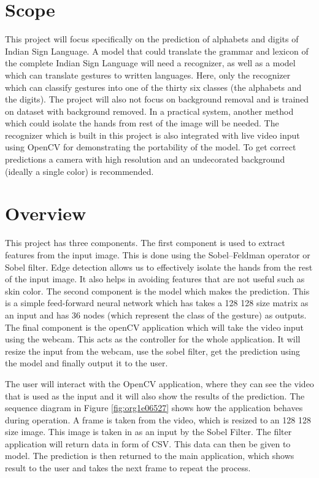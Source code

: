 \documentclass[a4paper,oneside,12pt]{report}
\begin{document}
\section{Scope}
\label{sec:orgebfc65b}
This project will focus specifically on the prediction of alphabets and digits of Indian Sign Language. A model that could translate the grammar and lexicon of the complete Indian Sign Language will need a recognizer, as well as a model which can translate gestures to written languages. Here, only the recognizer which can classify gestures into one of the thirty six classes (the alphabets and the digits). The project will also not focus on background removal and is trained on dataset with background removed. In a practical system, another method which could isolate the hands from rest of the image will be needed. The recognizer which is built in this project is also integrated with live video input using OpenCV for demonstrating the portability of the model. To get correct predictions a camera with high resolution and an undecorated background (ideally a single color) is recommended.

\section{Overview}
\label{sec:orgcb8e8a2}
This project has three components. The first component is used to extract features from the input image. This is done using the Sobel–Feldman operator or Sobel filter. Edge detection allows us to effectively isolate the hands from the rest of the input image. It also helps in avoiding features that are not useful such as skin color. The second component is the model which makes the prediction. This is a simple feed-forward neural network which has takes a 128 \texttimes{} 128 size matrix as an input and has 36 nodes (which represent the class of the gesture) as outputs. The final component is the openCV application which will take the video input using the webcam. This acts as the controller for the whole application. It will resize the input from the webcam, use the sobel filter, get the prediction using the model and finally output it to the user.

The user will interact with the OpenCV application, where they can see the video that is used as the input and it will also show the results of the prediction. The sequence diagram in Figure \ref{fig:org1e06527} shows how the application behaves during operation. A frame is taken from the video, which is resized to an 128 \texttimes{} 128 size image. This image is taken in as an input by the Sobel Filter. The filter application will return data in form of CSV. This data can then be given to model. The prediction is then returned to the main application, which shows result to the user and takes the next frame to repeat the process.
\end{document}
